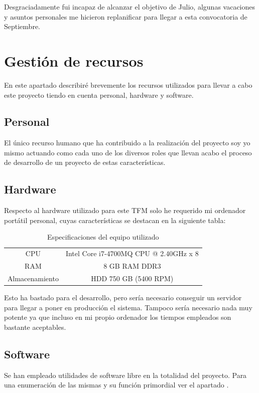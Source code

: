 Desgraciadamente fui incapaz de alcanzar el objetivo de Julio, algunas vacaciones y asuntos personales me hicieron replanificar para llegar a esta convocatoria de Septiembre.

\section{Gestión de recursos}
En este apartado describiré brevemente los recursos utilizados para llevar a cabo este proyecto tiendo en cuenta personal, hardware y software.

\subsection{Personal}
El único recurso humano que ha contribuido a la realización del proyecto soy yo mismo actuando como cada uno de los diversos roles que llevan acabo el proceso de desarrollo de un proyecto de estas características.

\subsection{Hardware}
Respecto al hardware utilizado para este \acrshort{TFM} solo he requerido mi ordenador portátil personal, cuyas características se destacan en la siguiente tabla:

\begin{table} [h!]
	\centering
	\begin{tabular}{c c}
		\hline
		CPU       & Intel \textregistered  Core \texttrademark  i7-4700MQ CPU @ 2.40GHz x 8 \\
		RAM       & 8 GB RAM DDR3                                                           \\
		Almacenamiento & HDD 750 GB (5400 RPM)                                                   \\ \hline
	\end{tabular}
	\caption{Especificaciones del equipo utilizado}
\end{table}

Esto ha bastado para el desarrollo, pero sería necesario conseguir un servidor para llegar a poner en producción el sistema. Tampoco sería necesario nada muy potente ya que incluso en mi propio ordenador los tiempos empleados son bastante aceptables.

\subsection{Software}
Se han empleado utilidades de software libre en la totalidad del proyecto. Para una enumeración de las mismas y su función primordial ver el apartado .

